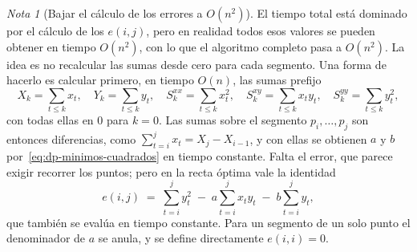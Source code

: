 \documentclass[12pt, spanish, oneside, openany]{book}
\theoremstyle{uprightplain}
\theoremstyle{definition}
\theoremstyle{remark}
\newtheorem{nota}[teorema]{Nota}
\theoremstyle{definition}
\begin{document}
\begin{nota}[Bajar el cálculo de los errores a $O(n^2)$]
\label{nota:dp-mcs-n2}
El tiempo total está dominado por el cálculo de los $e(i,j)$, pero en realidad todos esos valores se pueden obtener en tiempo $O(n^2)$, con lo que el algoritmo completo pasa a $O(n^2)$. La idea es no recalcular las sumas desde cero para cada segmento. Una forma de hacerlo es calcular primero, en tiempo $O(n)$, las sumas prefijo
\[
X_k=\sum_{t\le k}x_t,\quad Y_k=\sum_{t\le k}y_t,\quad
S^{xx}_k=\sum_{t\le k}x_t^2,\quad S^{xy}_k=\sum_{t\le k}x_ty_t,\quad
S^{yy}_k=\sum_{t\le k}y_t^2 ,
\]
con todas ellas en $0$ para $k=0$. Las sumas sobre el segmento $p_i,\dots,p_j$ son entonces diferencias, como $\sum_{t=i}^{j}x_t=X_j-X_{i-1}$, y con ellas se obtienen $a$ y $b$ por~\eqref{eq:dp-minimos-cuadrados} en tiempo constante. Falta el error, que parece exigir recorrer los puntos; pero en la recta óptima vale la identidad
\[
e(i,j) \;=\; \sum_{t=i}^{j} y_t^2 \;-\; a\sum_{t=i}^{j} x_ty_t \;-\; b\sum_{t=i}^{j} y_t ,
\]
que también se evalúa en tiempo constante. Para un segmento de un solo punto el denominador de $a$ se anula, y se define directamente $e(i,i)=0$.
\end{nota}
\end{document}
